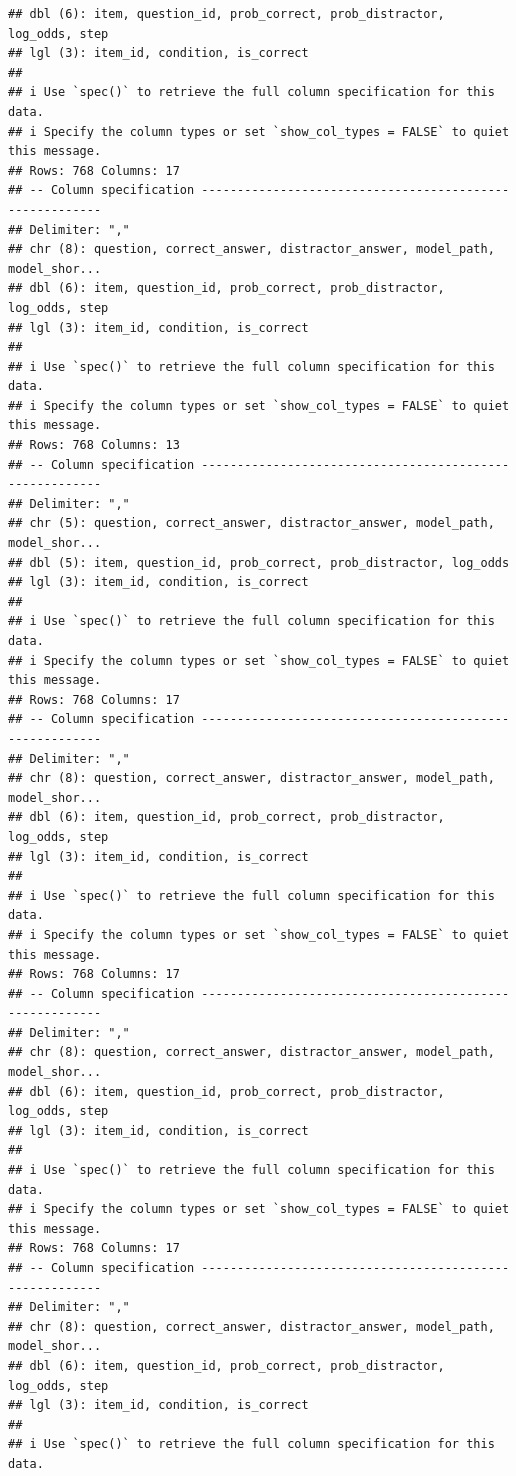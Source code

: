 \documentclass[
]{article}
\begin{document}
\begin{verbatim}
## dbl (6): item, question_id, prob_correct, prob_distractor, log_odds, step
## lgl (3): item_id, condition, is_correct
## 
## i Use `spec()` to retrieve the full column specification for this data.
## i Specify the column types or set `show_col_types = FALSE` to quiet this message.
## Rows: 768 Columns: 17
## -- Column specification --------------------------------------------------------
## Delimiter: ","
## chr (8): question, correct_answer, distractor_answer, model_path, model_shor...
## dbl (6): item, question_id, prob_correct, prob_distractor, log_odds, step
## lgl (3): item_id, condition, is_correct
## 
## i Use `spec()` to retrieve the full column specification for this data.
## i Specify the column types or set `show_col_types = FALSE` to quiet this message.
## Rows: 768 Columns: 13
## -- Column specification --------------------------------------------------------
## Delimiter: ","
## chr (5): question, correct_answer, distractor_answer, model_path, model_shor...
## dbl (5): item, question_id, prob_correct, prob_distractor, log_odds
## lgl (3): item_id, condition, is_correct
## 
## i Use `spec()` to retrieve the full column specification for this data.
## i Specify the column types or set `show_col_types = FALSE` to quiet this message.
## Rows: 768 Columns: 17
## -- Column specification --------------------------------------------------------
## Delimiter: ","
## chr (8): question, correct_answer, distractor_answer, model_path, model_shor...
## dbl (6): item, question_id, prob_correct, prob_distractor, log_odds, step
## lgl (3): item_id, condition, is_correct
## 
## i Use `spec()` to retrieve the full column specification for this data.
## i Specify the column types or set `show_col_types = FALSE` to quiet this message.
## Rows: 768 Columns: 17
## -- Column specification --------------------------------------------------------
## Delimiter: ","
## chr (8): question, correct_answer, distractor_answer, model_path, model_shor...
## dbl (6): item, question_id, prob_correct, prob_distractor, log_odds, step
## lgl (3): item_id, condition, is_correct
## 
## i Use `spec()` to retrieve the full column specification for this data.
## i Specify the column types or set `show_col_types = FALSE` to quiet this message.
## Rows: 768 Columns: 17
## -- Column specification --------------------------------------------------------
## Delimiter: ","
## chr (8): question, correct_answer, distractor_answer, model_path, model_shor...
## dbl (6): item, question_id, prob_correct, prob_distractor, log_odds, step
## lgl (3): item_id, condition, is_correct
## 
## i Use `spec()` to retrieve the full column specification for this data.

\end{verbatim}
\end{document}
